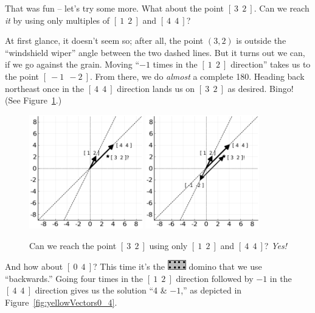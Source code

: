 \medskip

That was fun -- let's try some more. What about the point $[\ 3\ \ 2\ ]$. Can
we reach \textit{it} by using only multiples of $[\ 1\ \ 2\ ]$ and $[\ 4\ \ 4\
]$?

At first glance, it doesn't seem so; after all, the point $(3,2)$ is outside
the ``windshield wiper'' angle between the two dashed lines. But it turns out
we can, if we go against the grain. Moving ``$-1$ times in the $[\ 1\ \ 2\ ]$
direction'' takes us to the point $[\ -1\ \ -2\ ]$. From there, we do
\textit{almost} a complete 180\textdegree. Heading back northeast once in the
$[\ 4\ \ 4\ ]$ direction lands us on $[\ 3\ \ 2\ ]$ as desired. Bingo! (See
Figure~\ref{fig:yellowVectors3_2}.)

\begin{figure}[ht]
\centering
\includegraphics[width=0.44\textwidth]{yellowVectors3_2.png}
\includegraphics[width=0.44\textwidth]{yellowVectors3_2sol.png}
\caption{Can we reach the point $[\ 3\ \ 2\ ]$ using only $[\ 1\ \ 2\ ]$ and
$[\ 4\ \ 4\ ]$? \textit{Yes!}}
\label{fig:yellowVectors3_2}
\end{figure}

And how about $[\ 0\ \ 4\ ]$? This time it's the 
\includegraphics[width=0.06\textwidth]{gray4_4.png} domino that we use
``backwards.'' Going four times in the $[\ 1\ \ 2\ ]$ direction followed by
$-1$ in the $[\ 4\ \ 4\ ]$ direction gives us the solution ``4 \& $-1$,'' as
depicted in Figure~\ref{fig:yellowVectors0_4}.

